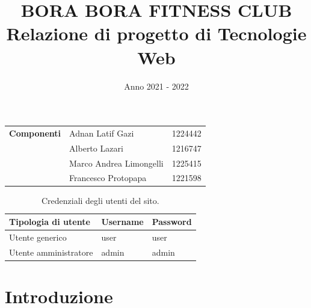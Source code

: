 \documentclass[a4paper]{article}
\title{
	\textbf{BORA BORA FITNESS CLUB}\\
	\large Relazione di progetto di Tecnologie Web
}
\date{Anno 2021 - 2022}
\begin{document}
	\maketitle

	\begin{center}
		\begin{tabular}{c|l l}
			\textbf{Componenti}	& Adnan Latif Gazi			& 1224442\\
								& Alberto Lazari			& 1216747\\
								& Marco Andrea Limongelli	& 1225415\\
								& Francesco Protopapa		& 1221598\\
		\end{tabular}
	\end{center}

	\begin{table}
		\centering
		\begin{tabular}{|l|l|l|}
			\hline
			\textbf{Tipologia di utente}	& \textbf{Username}	& \textbf{Password}\\
			\hline
			Utente generico					& user				& user\\
			\hline
			Utente amministratore			& admin				& admin\\
			\hline
		\end{tabular}
		\caption{Credenziali degli utenti del sito.}
	\end{table}

	\pagebreak

	\renewcommand{\contentsname}{Indice}
	\tableofcontents
	\pagebreak

	\section{Introduzione}
\end{document}
